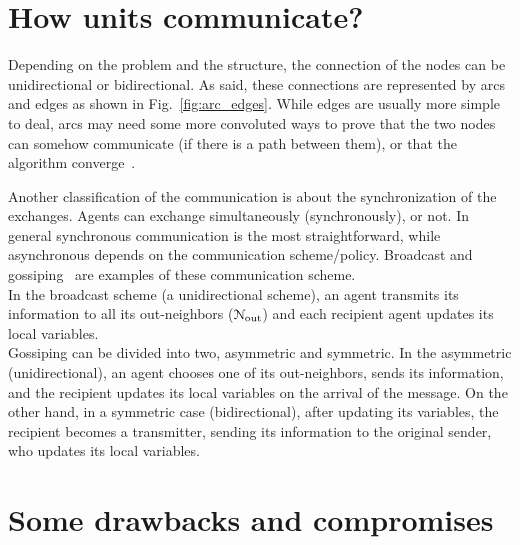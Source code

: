 \documentclass[../main.tex]{subfiles}
\begin{document}
\section{How units communicate?}
Depending on the problem and the structure, the connection of the nodes can be unidirectional or bidirectional. As said, these connections are represented by arcs and edges as shown in Fig.~\ref{fig:arc_edges}.
While edges are usually more simple to deal, arcs may need some more convoluted ways to prove that the two nodes can somehow communicate (if there is a path between them), or that the algorithm converge~\cite{GarinSchenato2010}.

Another classification of the communication is about the synchronization of the exchanges. Agents can exchange simultaneously (synchronously), or not. In general synchronous communication is the most straightforward, while asynchronous depends on the communication scheme/policy. Broadcast and gossiping~\cite{GarinSchenato2010} are examples of these communication scheme.
\\In the broadcast scheme (a unidirectional scheme), an agent transmits its information to all its out-neighbors ($\mathcal{N}_{\text{out}}$) and each recipient agent updates its local variables.
\\Gossiping can be divided into two, asymmetric and symmetric.
In the asymmetric (unidirectional), an agent chooses one of its out-neighbors, sends its information, and the recipient updates its local variables on the arrival of the message.
On the other hand, in a symmetric case (bidirectional), after updating its variables, the recipient becomes a transmitter, sending its information to the original sender, who updates its local variables.


\section{Some drawbacks and compromises}\label{sec:drawbacks}
\end{document}
